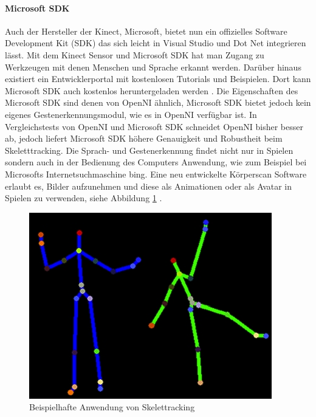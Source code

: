 \paragraph{Microsoft SDK}
Auch der Hersteller der Kinect, Microsoft, bietet nun ein offizielles Software Development Kit (SDK) das sich leicht in Visual Studio und Dot Net integrieren lässt.
Mit dem Kinect Sensor und Microsoft SDK hat man Zugang zu Werkzeugen mit denen Menschen und Sprache erkannt werden.
Darüber hinaus existiert ein Entwicklerportal mit kostenlosen Tutorials und Beispielen.
Dort kann Microsoft SDK auch kostenlos heruntergeladen werden \cite{kinect_4}.
Die Eigenschaften des Microsoft SDK sind denen von OpenNI ähnlich, Microsoft SDK bietet jedoch kein eigenes Gestenerkennungsmodul, wie es in OpenNI verfügbar ist.
In Vergleichstests von OpenNI und Microsoft SDK schneidet OpenNI bisher besser ab, jedoch liefert Microsoft SDK höhere Genauigkeit und Robustheit beim Skeletttracking.
Die Sprach- und Gestenerkennung findet nicht nur in Spielen sondern auch in der Bedienung des Computers Anwendung, wie zum Beispiel bei Microsofts Internetsuchmaschine bing.
Eine neu entwickelte Körperscan Software erlaubt es, Bilder aufzunehmen und diese als Animationen oder als Avatar in Spielen zu verwenden, siehe Abbildung \ref{fig:skelettracking} \cite{kinect_5}.

\begin{figure}[h]
	\center
	\includegraphics[scale=0.8]{graphics/skelettracking.jpg}
	\caption{\label{fig:skelettracking} Beispielhafte Anwendung von Skelettracking\cite{kinect_5}}
\end{figure}


